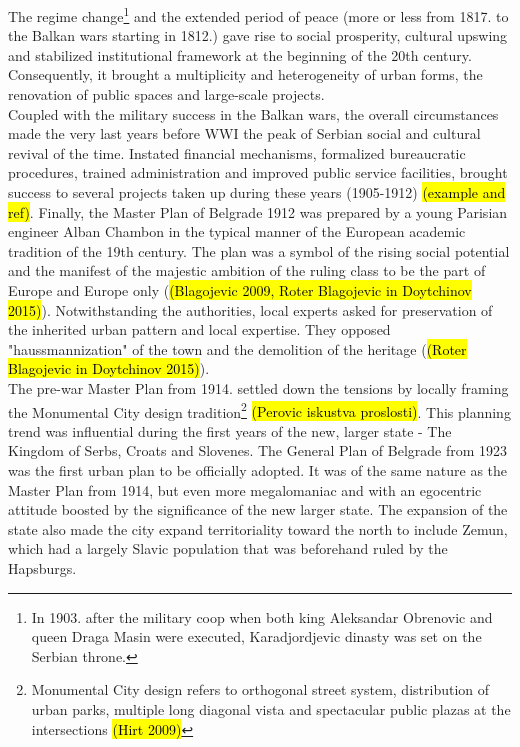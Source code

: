 \documentclass[11pt]{report}
\begin{document}
The regime change\footnote{In 1903. after the military coop when both king Aleksandar Obrenovic and queen Draga Masin were executed, Karadjordjevic dinasty was set on the Serbian throne.}
and the extended period of peace (more or less from 1817. to the Balkan wars starting in 1812.) gave rise to social prosperity, cultural upswing and stabilized institutional framework at the beginning of the 20th century. Consequently, it brought a multiplicity and heterogeneity of urban forms, the renovation of public spaces and large-scale projects.
\\
Coupled with the military success in the Balkan wars, the overall circumstances made the very last years before  WWI the peak of Serbian social and cultural revival of the time.
Instated financial mechanisms, formalized bureaucratic procedures, trained administration and improved public service facilities, brought success to several projects taken up during these years (1905-1912) \hl{(example and ref)}.
Finally, the Master Plan of  Belgrade 1912 was prepared by a young Parisian engineer Alban Chambon in the typical manner of the European academic tradition of the 19th century.
The plan was a symbol of the rising social potential and the manifest of the majestic ambition of the ruling class to be the part of Europe and Europe only 
(\hl{(Blagojevic 2009, Roter Blagojevic in Doytchinov 2015)}).
Notwithstanding the authorities, local experts asked for preservation of the inherited urban pattern and local expertise. They opposed "haussmannization" of the town and the demolition of the heritage (\hl{(Roter Blagojevic in Doytchinov 2015)}).
\\
The pre-war Master Plan from 1914. settled down the tensions by locally framing the Monumental City design tradition\footnote{Monumental City design refers to orthogonal street system, distribution of urban parks, multiple long diagonal vista and spectacular public plazas at the intersections \hl{(Hirt 2009)}} \hl{(Perovic iskustva proslosti)}.
This planning trend was influential during the first years of the new, larger state - The Kingdom of Serbs, Croats and Slovenes.
The  General  Plan  of  Belgrade  from  1923 was the first urban plan to be officially adopted.
It was of the same nature as the Master Plan from 1914, but even more megalomaniac and with an egocentric attitude boosted by the significance of the new larger state.
The expansion of the state also made the city expand territoriality toward the north to include Zemun, which had a largely Slavic population that was beforehand ruled by the Hapsburgs.
\end{document}
